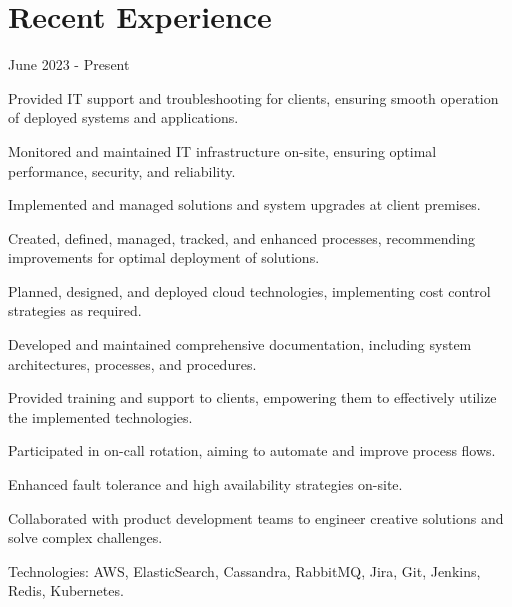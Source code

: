 \section{Recent Experience}

 {June 2023 - Present}
\begin{resume_list}
    \item Provided IT support and troubleshooting for clients, ensuring smooth operation of deployed systems and applications.
    \item Monitored and maintained IT infrastructure on-site, ensuring optimal performance, security, and reliability.
    \item Implemented and managed solutions and system upgrades at client premises.
    \item Created, defined, managed, tracked, and enhanced processes, recommending improvements for optimal deployment of solutions.
    \item Planned, designed, and deployed cloud technologies, implementing cost control strategies as required.
    \item Developed and maintained comprehensive documentation, including system architectures, processes, and procedures.
    \item Provided training and support to clients, empowering them to effectively utilize the implemented technologies.
    \item Participated in on-call rotation, aiming to automate and improve process flows.
    \item Enhanced fault tolerance and high availability strategies on-site.
    \item Collaborated with product development teams to engineer creative solutions and solve complex challenges.
    \item Technologies: AWS, ElasticSearch, Cassandra, RabbitMQ, Jira, Git, Jenkins, Redis, Kubernetes.
\end{resume_list}

